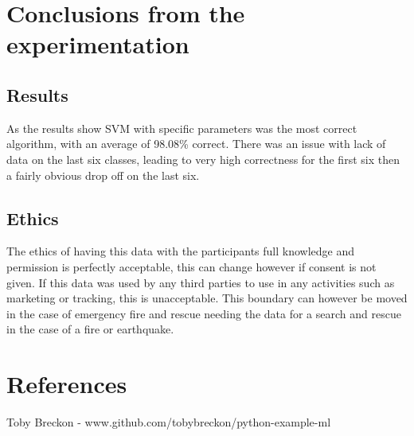 \documentclass[paper=a4, fontsize=11pt]{scrartcl}
\numberwithin{equation}{section}		%
\numberwithin{figure}{section}			%
\numberwithin{table}{section}				%
\begin{document}
\section{Conclusions from the experimentation}

\subsection{Results}

As the results show SVM with specific parameters was the most correct algorithm, with an average of 98.08\% correct. There was an issue with lack of data on the last six classes, leading to very high correctness for the first six then a fairly obvious drop off on the last six.

\subsection{Ethics}

The ethics of having this data with the participants full knowledge and permission is perfectly acceptable, this can change however if consent is not given. If this data was used by any third parties to use in any activities such as marketing or tracking, this is unacceptable. This boundary can however be moved in the case of emergency fire and rescue needing the data for a search and rescue in the case of a fire or earthquake. 

\section{References}

Toby Breckon - www.github.com/tobybreckon/python-example-ml

\end{document}

